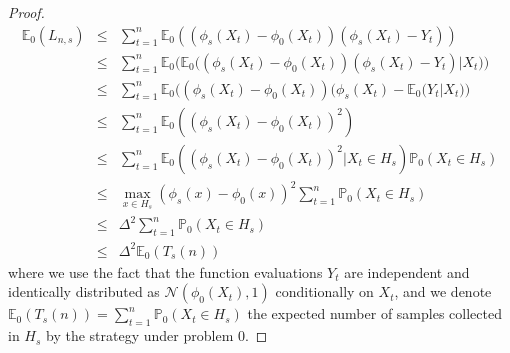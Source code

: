 \documentclass[final,12pt]{colt2018}
\begin{document}
\begin{proof}
\begin{eqnarray*}
\mathbb E_0(L_{n,s}) & \leq & \sum_{t=1}^n \mathbb E_0\left((\phi_s(X_t)-\phi_0(X_t))(\phi_s(X_t)-Y_t)\right)\\
& \leq & \sum_{t=1}^n \mathbb E_0\Big(\mathbb E_0\big((\phi_s(X_t)-\phi_0(X_t))(\phi_s(X_t)-Y_t) \big| X_t\big)\Big)\\
& \leq & \sum_{t=1}^n \mathbb E_0\Big((\phi_s(X_t)-\phi_0(X_t))(\phi_s(X_t) - \mathbb E_0\big(Y_t \big| X_t\big)\Big)\\
& \leq & \sum_{t=1}^n \mathbb E_0\left((\phi_s(X_t)-\phi_0(X_t))^2\right)\\
& \leq & \sum_{t=1}^n \mathbb E_0\left((\phi_s(X_t)-\phi_0(X_t))^2\big| X_t \in H_s\right)\mathbb P_0(X_t \in H_s)\\
& \leq & \max_{x \in H_s}(\phi_s(x)-\phi_0(x))^2 \sum_{t=1}^n \mathbb P_0(X_t \in H_s)\\
& \leq & \Delta^2 \sum_{t=1}^n \mathbb P_0(X_t \in H_s)\\
& \leq & \Delta^2 \mathbb E_0(T_s(n))
\end{eqnarray*}
where we use the fact that the function evaluations $Y_t$ are independent and identically distributed as $\mathcal N(\phi_0(X_t), 1)$ conditionally on $X_t$, and we denote $\mathbb E_0(T_s(n)) =\sum_{t=1}^n \mathbb P_0(X_t \in H_s)$ the expected number of samples collected in $H_s$ by the strategy under problem $0$.

\end{proof}
\end{document}
